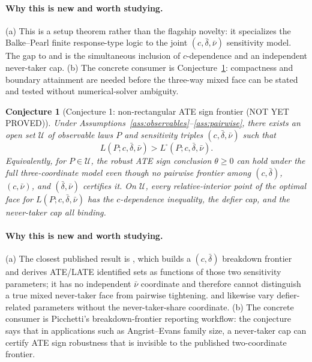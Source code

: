 \documentclass[11pt]{article}
\theoremstyle{definition}
\theoremstyle{plain}
\newtheorem{conjecture}{Conjecture}
\theoremstyle{remark}
\begin{document}
\paragraph{Why this is new and worth studying.}
(a) This is a setup theorem rather than the flagship novelty: it specializes
the Balke--Pearl finite response-type logic to the joint
\((c,\bar\delta,\bar\nu)\) sensitivity model.  The gap to
\citet{BalkePearl1997} and \citet{Picchetti2026} is the simultaneous inclusion
of \(c\)-dependence and an independent never-taker cap.  (b) The concrete
consumer is Conjecture~\ref{conj:nonrectangular}: compactness and boundary
attainment are needed before the three-way mixed face can be stated and tested
without numerical-solver ambiguity.

\begin{conjecture}[Conjecture 1: non-rectangular ATE sign frontier (NOT YET PROVED)]\label{conj:nonrectangular}
Under Assumptions~\ref{ass:observables}--\ref{ass:pairwise}, there exists an
open set \(\mathcal U\) of observable laws \(P\) and sensitivity triples
\((c,\bar\delta,\bar\nu)\) such that
\[
  L(P;c,\bar\delta,\bar\nu) >
  L^\square(P;c,\bar\delta,\bar\nu).
\]
Equivalently, for \(P\in\mathcal U\), the robust ATE sign conclusion
\(\theta\ge 0\) can hold under the full three-coordinate model even though no
pairwise frontier among \((c,\bar\delta)\), \((c,\bar\nu)\), and
\((\bar\delta,\bar\nu)\) certifies it.  On \(\mathcal U\), every
relative-interior point of the optimal face for
\(L(P;c,\bar\delta,\bar\nu)\) has the \(c\)-dependence inequality, the defier
cap, and the never-taker cap all binding.
\end{conjecture}

\paragraph{Why this is new and worth studying.}
(a) The closest published result is \citet{Picchetti2026}, which builds a
\((c,\bar\delta)\) breakdown frontier and derives ATE/LATE identified sets as
functions of those two sensitivity parameters; it has no independent
\(\bar\nu\) coordinate and therefore cannot distinguish a true mixed
never-taker face from pairwise tightening.  \citet{Noack2021} and
\citet{Yap2022} likewise vary defier-related parameters without the
never-taker-share coordinate.  (b) The concrete consumer is Picchetti's
breakdown-frontier reporting workflow: the conjecture says that in applications
such as Angrist--Evans family size, a never-taker cap can certify ATE sign
robustness that is invisible to the published two-coordinate frontier.
\end{document}
